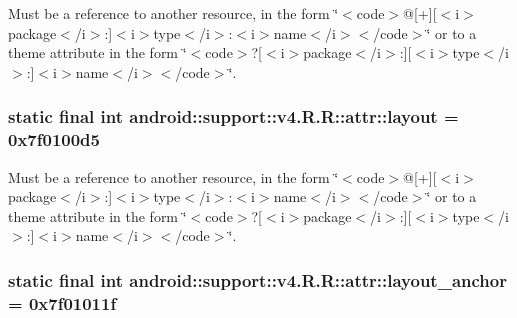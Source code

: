 Must be a reference to another resource, in the form \char`\"{}$<$code$>$@\mbox{[}+\mbox{]}\mbox{[}$<$i$>$package$<$/i$>$:\mbox{]}$<$i$>$type$<$/i$>$:$<$i$>$name$<$/i$>$$<$/code$>$\char`\"{} or to a theme attribute in the form \char`\"{}$<$code$>$?\mbox{[}$<$i$>$package$<$/i$>$:\mbox{]}\mbox{[}$<$i$>$type$<$/i$>$:\mbox{]}$<$i$>$name$<$/i$>$$<$/code$>$\char`\"{}. \hypertarget{classandroid_1_1support_1_1v4_1_1_r_1_1attr_6b3a9bdbfb64eb312a1689576443dce5}{
\subsubsection[{layout}]{\setlength{\rightskip}{0pt plus 5cm}static final int android::support::v4.R.R::attr::layout = 0x7f0100d5}}
\label{classandroid_1_1support_1_1v4_1_1_r_1_1attr_6b3a9bdbfb64eb312a1689576443dce5}


Must be a reference to another resource, in the form \char`\"{}$<$code$>$@\mbox{[}+\mbox{]}\mbox{[}$<$i$>$package$<$/i$>$:\mbox{]}$<$i$>$type$<$/i$>$:$<$i$>$name$<$/i$>$$<$/code$>$\char`\"{} or to a theme attribute in the form \char`\"{}$<$code$>$?\mbox{[}$<$i$>$package$<$/i$>$:\mbox{]}\mbox{[}$<$i$>$type$<$/i$>$:\mbox{]}$<$i$>$name$<$/i$>$$<$/code$>$\char`\"{}. \hypertarget{classandroid_1_1support_1_1v4_1_1_r_1_1attr_4e6b802ebb8e8362127838504624cbd5}{
\subsubsection[{layout\_\-anchor}]{\setlength{\rightskip}{0pt plus 5cm}static final int android::support::v4.R.R::attr::layout\_\-anchor = 0x7f01011f}}
\label{classandroid_1_1support_1_1v4_1_1_r_1_1attr_4e6b802ebb8e8362127838504624cbd5}


